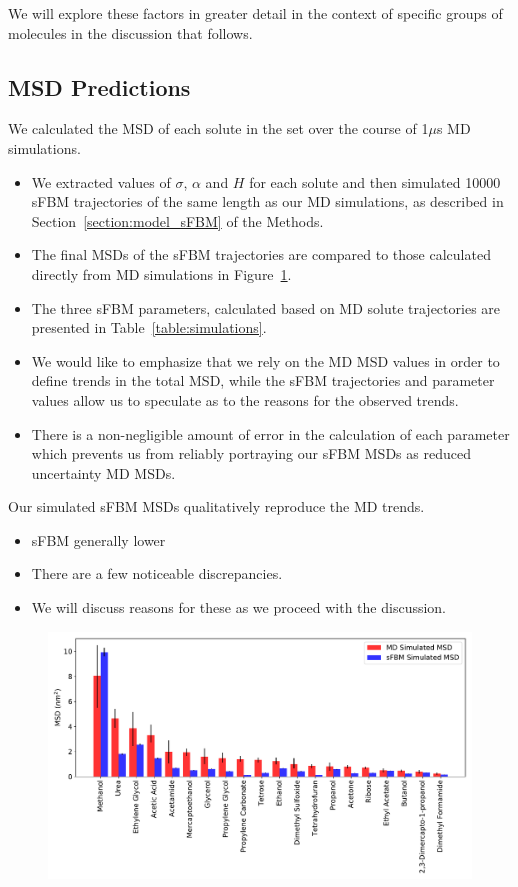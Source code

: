\documentclass{article}
\begin{document}
  We will explore these factors in greater detail in the context of 
  specific groups of molecules in the discussion that follows.

  \subsection{MSD Predictions}\label{section:msd_predictions}
  
  \noindent We calculated the MSD of each solute in the set over the course of 1$\mu$s MD simulations.  %
  \begin{itemize}
	\item We extracted values of $\sigma$, $\alpha$ and $H$ for each solute
	and then simulated 10000 sFBM trajectories of the same length as our MD
	simulations, as described in Section~\ref{section:model_sFBM} of the Methods.
	\item The final MSDs of the sFBM trajectories are compared to those 
	calculated directly from MD simulations in Figure~\ref{fig:all_msds}. 
	\item The three sFBM parameters, calculated based on MD solute trajectories
	are presented in Table~\ref{table:simulations}.
	\item We would like to emphasize that we rely on the MD MSD values in order to
	define trends in the total MSD, while the sFBM trajectories and parameter 
	values allow us to speculate as to the reasons for the observed trends. 
	\item There is a non-negligible amount of error in the calculation of 
	each parameter which prevents us from reliably portraying our sFBM MSDs as
	reduced	uncertainty MD MSDs.
  \end{itemize}
  
  Our simulated sFBM MSDs qualitatively reproduce the MD trends.
  \begin{itemize}
    \item sFBM generally lower
    \item There are a few noticeable discrepancies.
    \item We will discuss reasons for these as we proceed with the discussion.
  \end{itemize}

  \begin{figure}
  \centering
  \includegraphics[width=\textwidth]{all_emsds.pdf}
  \caption{}\label{fig:all_msds}
  \end{figure}
  
\end{document}

